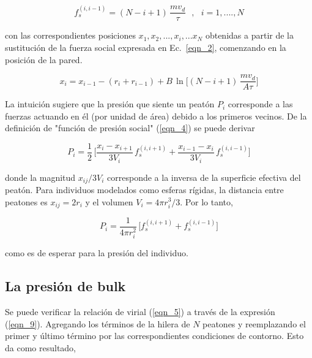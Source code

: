 \begin{equation}
f_s^{(i,i-1)}=(N-i+1)\,\displaystyle\frac{mv_d}{\tau}\ \ \ , \ \ \ 
i=1,....,N\label{eqn_7}
\end{equation}

\noindent con las correspondientes posiciones  $x_1,x_2,...,x_{i},...x_N$ obtenidas a partir de la sustitución de la fuerza social expresada en Ec.~\ref{eqn_2}, comenzando en la posición de la pared.

\begin{equation} 
x_i=x_{i-1}-(r_{i}+r_{i-1})+B\,\ln\bigg[(N-i+1)\,\displaystyle\frac{mv_d}{A\tau}
\bigg]\label{eqn_8}
\end{equation}

La intuición sugiere que la presión que siente un peatón $P_i$ 
corresponde a las fuerzas actuando en él (por unidad de área) debido a los primeros vecinos. De la definición de "función de presión social" (\ref{eqn_4}) se puede derivar

\begin{equation}
P_i=\displaystyle\frac{1}{2}\,\bigg[\displaystyle\frac{x_{i}-x_{i+1}}{3V_i}\,
f_s^ { (i , i+1) } +\displaystyle\frac { x_ {i-1}-x_{i}}{3V_i}\,f_s^{(i,i-1) 
}\bigg]\label{eqn_9}
\end{equation}

\vspace{3mm}

\noindent donde la magnitud $x_{ij}/3V_i$ corresponde a la inversa de la superficie efectiva del peatón. Para individuos modelados como esferas rígidas, la distancia entre peatones es $x_{ij}=2r_i$ y el volumen $V_i=4\pi r_i^3/3$. Por lo tanto, 

\begin{equation}
P_i=\displaystyle\frac{1}{4\pi 
r_i^2}\,\bigg[f_s^ { (i , i+1) } +f_s^{(i,i-1)}\bigg]\label{eqn_10}
\end{equation}

\noindent como es de esperar para la presión del individuo.  \\

\subsection{\label{bulk_pressure}La presión de bulk}

Se puede verificar la relación de virial (\ref{eqn_5}) a través de la expresión (\ref{eqn_9}). Agregando los términos de la hilera de $N$ peatones y reemplazando el primer y último término por las correspondientes condiciones de contorno. Esto da como resultado,


